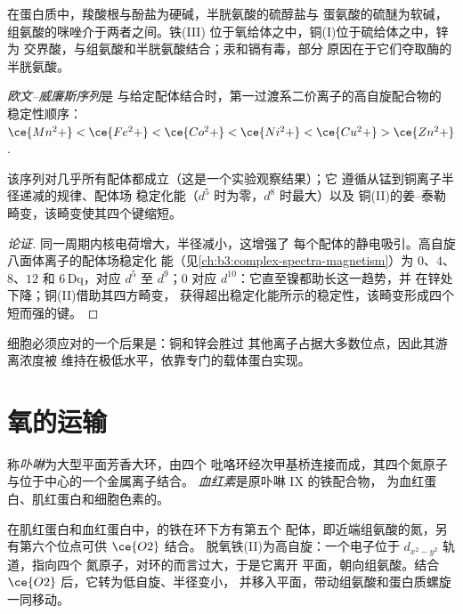 在蛋白质中，羧酸根与酚盐为硬碱，半胱氨酸的硫醇盐与
蛋氨酸的硫醚为软碱，组氨酸的咪唑介于两者之间。铁(III)
位于氧给体之中，铜(I)位于硫给体之中，锌为
交界酸，与组氨酸和半胱氨酸结合；汞和镉有毒，部分
原因在于它们夺取酶的半胱氨酸。

\begin{definition}[欧文–威廉斯序列]\label{def:b3:bioinorganic:irving-williams}
\emph{欧文–威廉斯序列}是
与给定配体结合时，第一过渡系二价离子的高自旋配合物的
稳定性顺序：
$\ce{Mn^2+} < \ce{Fe^2+} < \ce{Co^2+} < \ce{Ni^2+} < \ce{Cu^2+} > \ce{Zn^2+}$.
\end{definition}

\begin{proposition}[欧文–威廉斯顺序]\label{prop:b3:bioinorganic:irving-williams}
该序列对几乎所有配体都成立（这是一个实验观察结果）；它
遵循从锰到铜离子半径递减的规律、配体场
稳定化能（$d^5$ 时为零，$d^8$ 时最大）以及
铜(II)的姜–泰勒畸变，该畸变使其四个键缩短。
\end{proposition}

\begin{proof}[论证]
同一周期内核电荷增大，半径减小，这增强了
每个配体的静电吸引。高自旋八面体离子的配体场稳定化
能（见\cref{ch:b3:complex-spectra-magnetism}）为 $0$、$4$、
$8$、$12$ 和 $6\,\mathrm{Dq}$，对应 $d^5$ 至 $d^9$；$0$ 对应 $d^{10}$：它直至镍都助长这一趋势，并
在锌处下降；铜(II)借助其四方畸变，
获得超出稳定化能所示的稳定性，该畸变形成四个短而强的键。
\end{proof}

细胞必须应对的一个后果是：铜和锌会胜过
其他离子占据大多数位点，因此其游离浓度被
维持在极低水平，依靠专门的载体蛋白实现。

\section{氧的运输}

\begin{definition}[卟啉与血红素]\label{def:b3:bioinorganic:haem}
称\emph{卟啉}为大型平面芳香大环，由四个
吡咯环经次甲基桥连接而成，其四个氮原子与位于中心的一个金属离子结合。
\emph{血红素}是原卟啉 IX 的铁配合物，
为血红蛋白、肌红蛋白和细胞色素的。
\end{definition}

在肌红蛋白和血红蛋白中，的铁在环下方有第五个
配体，即近端组氨酸的氮，另有第六个位点可供 $\ce{O2}$ 结合。
脱氧铁(II)为高自旋：一个电子位于 $d_{x^2-y^2}$ 轨道，指向四个
氮原子，对环的而言过大，于是它离开
平面，朝向组氨酸。结合 $\ce{O2}$ 后，它转为低自旋、半径变小，
并移入平面，带动组氨酸和蛋白质螺旋一同移动。

